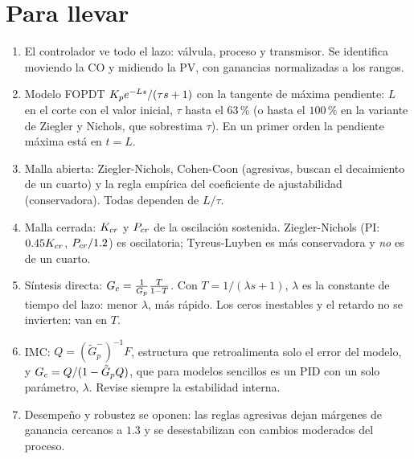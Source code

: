 \section{Para llevar}
\label{sec:ps-cierre}

\begin{parallevar}
\begin{enumerate}
  \item El controlador ve todo el lazo: válvula, proceso y transmisor. Se identifica moviendo la CO y midiendo la PV, con ganancias normalizadas a los rangos.
  \item Modelo FOPDT $K_p e^{-Ls}/(\tau s+1)$ con la tangente de máxima pendiente: $L$ en el corte con el valor inicial, $\tau$ hasta el $63$\,\% (o hasta el $100$\,\% en la variante de Ziegler y Nichols, que sobrestima $\tau$). En un primer orden la pendiente máxima está en $t=L$.
  \item Malla abierta: Ziegler-Nichols, Cohen-Coon (agresivas, buscan el decaimiento de un cuarto) y la regla empírica del coeficiente de ajustabilidad (conservadora). Todas dependen de $L/\tau$.
  \item Malla cerrada: $K_{cr}$ y $P_{cr}$ de la oscilación sostenida. Ziegler-Nichols (PI: $0.45K_{cr}$, $P_{cr}/1.2$) es oscilatoria; Tyreus-Luyben es más conservadora y \emph{no} es de un cuarto.
  \item Síntesis directa: $G_c=\frac{1}{G_p}\frac{T}{1-T}$. Con $T=1/(\lambda s+1)$, $\lambda$ es la constante de tiempo del lazo: menor $\lambda$, más rápido. Los ceros inestables y el retardo no se invierten: van en $T$.
  \item IMC: $Q=(\tilde G_p^-)^{-1}F$, estructura que retroalimenta solo el error del modelo, y $G_c=Q/(1-\tilde G_pQ)$, que para modelos sencillos es un PID con un solo parámetro, $\lambda$. Revise siempre la estabilidad interna.
  \item Desempeño y robustez se oponen: las reglas agresivas dejan márgenes de ganancia cercanos a $1.3$ y se desestabilizan con cambios moderados del proceso.
\end{enumerate}
\end{parallevar}

